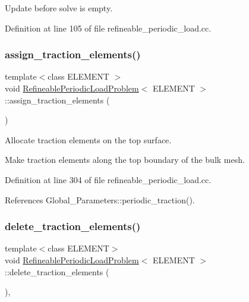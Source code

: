 Update before solve is empty. 



Definition at line 105 of file refineable\+\_\+periodic\+\_\+load.\+cc.

\mbox{\label{classRefineablePeriodicLoadProblem_a0de046a3d8a5d88f01d782fdc1be82a0}} 
\subsubsection{\texorpdfstring{assign\+\_\+traction\+\_\+elements()}{assign\_traction\_elements()}}
{\footnotesize\ttfamily template$<$class E\+L\+E\+M\+E\+NT $>$ \\
void \hyperlink{classRefineablePeriodicLoadProblem}{Refineable\+Periodic\+Load\+Problem}$<$ E\+L\+E\+M\+E\+NT $>$\+::assign\+\_\+traction\+\_\+elements (\begin{DoxyParamCaption}{ }\end{DoxyParamCaption})\hspace{0.3cm}{\ttfamily [private]}}



Allocate traction elements on the top surface. 

Make traction elements along the top boundary of the bulk mesh. 

Definition at line 304 of file refineable\+\_\+periodic\+\_\+load.\+cc.



References Global\+\_\+\+Parameters\+::periodic\+\_\+traction().

\mbox{\label{classRefineablePeriodicLoadProblem_a491998bff6616edaa5e29bf155d0284b}} 
\subsubsection{\texorpdfstring{delete\+\_\+traction\+\_\+elements()}{delete\_traction\_elements()}}
{\footnotesize\ttfamily template$<$class E\+L\+E\+M\+E\+NT$>$ \\
void \hyperlink{classRefineablePeriodicLoadProblem}{Refineable\+Periodic\+Load\+Problem}$<$ E\+L\+E\+M\+E\+NT $>$\+::delete\+\_\+traction\+\_\+elements (\begin{DoxyParamCaption}{ }\end{DoxyParamCaption})\hspace{0.3cm}{\ttfamily [inline]}, {\ttfamily [private]}}



